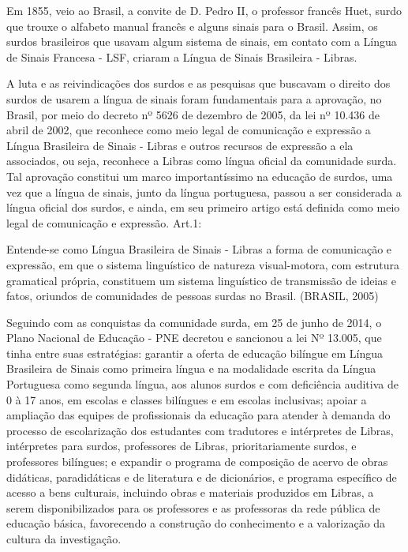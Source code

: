 \documentclass[brasil]{abnt}
\begin{document}
		Em 1855, veio ao Brasil, a convite de D. Pedro II, o professor francês Huet, surdo que trouxe o alfabeto manual francês e alguns sinais para o Brasil. Assim, os surdos brasileiros que 
		usavam algum sistema de sinais, em contato com a Língua de Sinais Francesa - LSF, criaram a Língua de Sinais Brasileira - Libras. 
		
		A luta e as reivindicações dos surdos e as pesquisas que buscavam o direito dos surdos de usarem a língua de sinais foram fundamentais para a aprovação, no Brasil, por meio do decreto nº 5626 de dezembro de 2005,
		da lei nº 10.436 de abril de 2002, que reconhece como meio legal de comunicação e expressão a Língua Brasileira de Sinais - Libras e outros recursos de expressão a ela associados, ou seja, reconhece a Libras 
		como língua oficial da comunidade surda. Tal aprovação constitui um marco importantíssimo na educação de surdos, uma vez que a língua de sinais, junto da língua portuguesa, passou a ser considerada a 
		língua oficial dos surdos, e ainda, em seu primeiro artigo está definida como meio legal de comunicação e expressão. Art.1:
			
				\begin{citacao} Entende-se como Língua Brasileira de Sinais - Libras a forma de comunicação e expressão, em que o sistema linguístico de natureza visual-motora, com estrutura gramatical própria, constituem
								um sistema linguístico de transmissão de ideias e fatos, 
								oriundos de comunidades de pessoas surdas no Brasil. 
								(BRASIL, 2005)
				\end{citacao}
				
		Seguindo com as conquistas da comunidade surda, em 25 de junho de 
		2014, o Plano Nacional de Educação - PNE decretou e sancionou a lei 
		Nº 13.005, que tinha entre suas estratégias: garantir a
		oferta de educação bilíngue em Língua Brasileira de Sinais 
		como primeira língua e na modalidade escrita da Língua Portuguesa como segunda língua, aos alunos surdos e com deficiência auditiva de 0 à 17 anos, em escolas e classes bilíngues e em escolas 
		inclusivas; apoiar a ampliação das equipes de profissionais da educação para atender à demanda do processo de escolarização dos estudantes com tradutores e intérpretes de Libras, intérpretes para surdos, 
		professores de Libras, prioritariamente surdos, e professores bilíngues; e expandir o programa de composição de acervo de obras didáticas, paradidáticas e de literatura e de dicionários, e programa 
		específico de acesso a bens culturais, incluindo obras e materiais produzidos em Libras, a serem disponibilizados para os professores e as professoras da rede pública de educação básica, favorecendo a 
		construção do conhecimento e a valorização da cultura da investigação.
				
\end{document}
